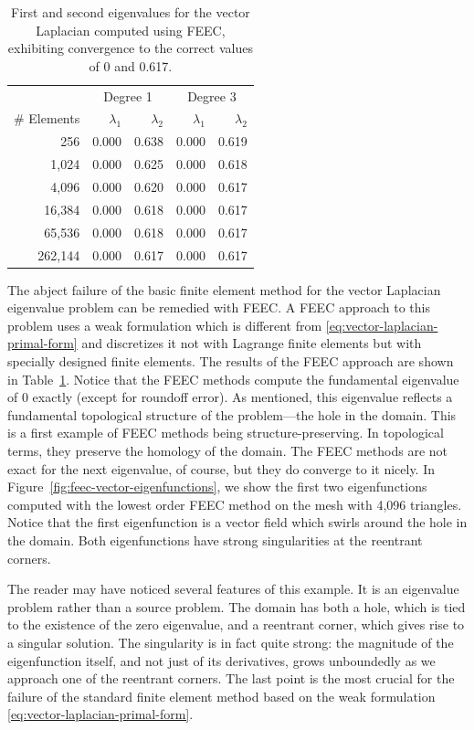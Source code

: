 \begin{table}[H]\centering
\caption{{First and second eigenvalues for the vector Laplacian computed using FEEC, exhibiting convergence to the correct values of 0 and 0.617.}}\label{tab:feec-vector-eigenvalues}
\begin{tabular}{r|rr|rr}\hline
&\multicolumn{2}{c|}{{Degree 1}}&\multicolumn{2}{c}{{Degree 3}}\\
{\# Elements}&$\lambda_1$&$\lambda_2$&$\lambda_1$&$\lambda_2$\\\hline
256&0.000&0.638&0.000&0.619\\
1,024&0.000&0.625&0.000&0.618\\
4,096&0.000&0.620&0.000&0.617\\
16,384&0.000&0.618&0.000&0.617\\
65,536&0.000&0.618&0.000&0.617\\
262,144&0.000&0.617&0.000&0.617\\\hline
\end{tabular}
\end{table}

{The abject failure of the basic finite element method for the vector Laplacian eigenvalue problem can be remedied with FEEC. A FEEC approach to this problem uses a weak formulation which is different from \eqref{eq:vector-laplacian-primal-form} and discretizes it not with Lagrange finite elements but with specially designed finite elements. The results of the FEEC approach are shown in Table~\ref{tab:feec-vector-eigenvalues}. Notice that the FEEC methods compute the fundamental eigenvalue of 0 exactly (except for roundoff error). As mentioned, this eigenvalue reflects a fundamental topological structure of the problem---the hole in the domain. This is a first example of FEEC methods being structure-preserving. In topological terms, they preserve the homology of the domain. The FEEC methods are not exact for the next eigenvalue, of course, but they do converge to it nicely. In Figure~\ref{fig:feec-vector-eigenfunctions}, we show the first two eigenfunctions computed with the lowest order FEEC method on the mesh with 4,096 triangles. Notice that the first eigenfunction is a vector field which swirls around the hole in the domain. Both eigenfunctions have strong singularities at the reentrant corners.}

{The reader may have noticed several features of this example. It is an eigenvalue problem rather than a source problem. The domain has both a hole, which is tied to the existence of the zero eigenvalue, and a reentrant corner, which gives rise to a singular solution. The singularity is in fact quite strong: the magnitude of the eigenfunction itself, and not just of its derivatives, grows unboundedly as we approach one of the reentrant corners. The last point is the most crucial for the failure of the standard finite element method based on the weak formulation \eqref{eq:vector-laplacian-primal-form}.}

